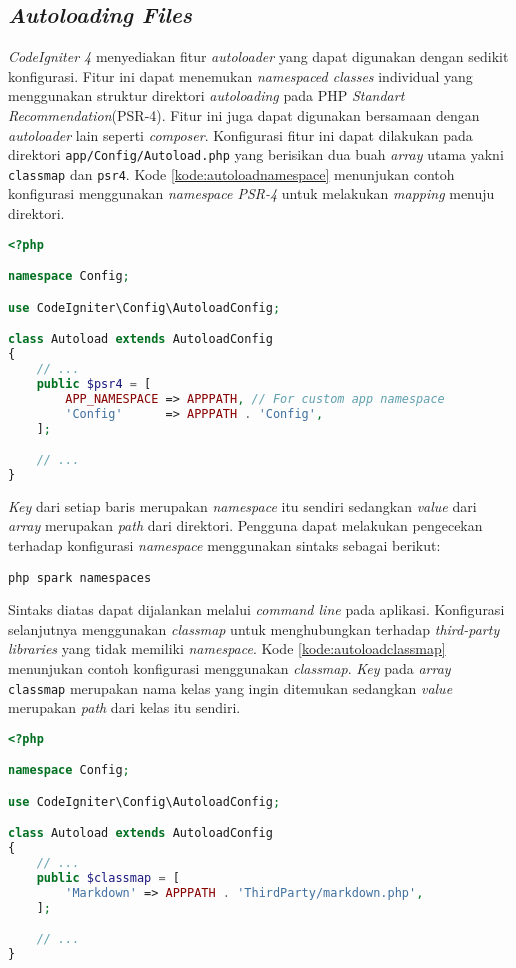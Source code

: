 \subsection{\textit{Autoloading Files}}
\textit{CodeIgniter 4} menyediakan fitur \textit{autoloader} yang dapat digunakan dengan sedikit konfigurasi. Fitur ini dapat menemukan \textit{namespaced classes} individual yang menggunakan struktur direktori \textit{autoloading} pada PHP \textit{Standart Recommendation}(PSR-4). Fitur ini juga dapat digunakan bersamaan dengan \textit{autoloader} lain seperti \textit{composer}. Konfigurasi fitur ini dapat dilakukan pada direktori \texttt{app/Config/Autoload.php} yang berisikan dua buah \textit{array} utama yakni \texttt{classmap} dan \texttt{psr4}. Kode \ref{kode:autoloadnamespace} menunjukan contoh konfigurasi menggunakan \textit{namespace PSR-4} untuk melakukan \textit{mapping} menuju direktori.
\begin{lstlisting}[language=PHP, caption=Contoh konfigurasi menggunakan \textit{namespace PSR-4}. ,label=kode:autoloadnamespace]
<?php

namespace Config;

use CodeIgniter\Config\AutoloadConfig;

class Autoload extends AutoloadConfig
{
    // ...
    public $psr4 = [
        APP_NAMESPACE => APPPATH, // For custom app namespace
        'Config'      => APPPATH . 'Config',
    ];

    // ...
}
\end{lstlisting}
\textit{Key} dari setiap baris merupakan \textit{namespace} itu sendiri sedangkan \textit{value} dari \textit{array} merupakan \textit{path} dari direktori. Pengguna dapat melakukan pengecekan terhadap konfigurasi \textit{namespace} menggunakan sintaks sebagai berikut:
\begin{center}
	\verb|php spark namespaces|
\end{center}
Sintaks diatas dapat dijalankan melalui \textit{command line} pada aplikasi. Konfigurasi selanjutnya menggunakan \textit{classmap} untuk menghubungkan terhadap \textit{third-party libraries} yang tidak memiliki \textit{namespace}. Kode \ref{kode:autoloadclassmap} menunjukan contoh konfigurasi menggunakan \textit{classmap}. \textit{Key} pada \textit{array} \texttt{classmap} merupakan nama kelas yang ingin ditemukan sedangkan \textit{value} merupakan \textit{path} dari kelas itu sendiri.

\begin{lstlisting}[language=PHP, caption=Contoh konfigurasi menggunakan \textit{classmap}. ,label=kode:autoloadclassmap]
<?php

namespace Config;

use CodeIgniter\Config\AutoloadConfig;

class Autoload extends AutoloadConfig
{
    // ...
    public $classmap = [
        'Markdown' => APPPATH . 'ThirdParty/markdown.php',
    ];

    // ...
}
\end{lstlisting}

